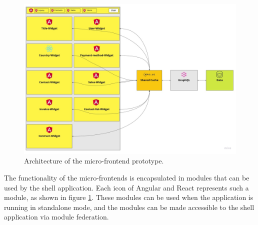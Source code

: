 \ifshowImages
\begin{figure}[H]
\centering
\includegraphics[width=0.8\linewidth]{images/ui-dashboard-architecture.jpg}
\caption{Architecture of the micro-frontend prototype.}\label{figure:methods:ui-dashboard-architecture}
\end{figure}
\fi

The functionality of the micro-frontends is encapsulated in modules that can be used by the shell application. Each icon of Angular and React represents such a module, as shown in figure \ref{figure:methods:ui-dashboard-architecture}. These modules can be used when the application is running in standalone mode, and the modules can be made accessible to the shell application via module federation.

\ifshowUnusedContent



